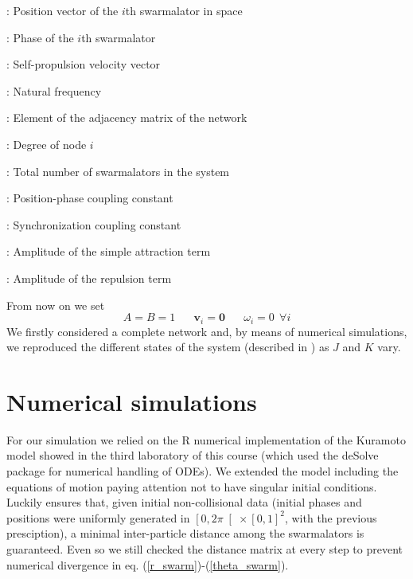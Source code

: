 \begin{multicols}{2}
\begin{description}[noitemsep]
    \item[\(\mathbf{x}_i\)]: Position vector of the \(i\)th swarmalator in space
    \item[\(\theta_i\)]: Phase of the \(i\)th swarmalator
    \item[\(\mathbf{v}_i\)]: Self-propulsion velocity vector
    \item[\(\omega_i\)]: Natural frequency
    \item[\(A_{ij}\)]: Element of the adjacency matrix of the network
    \item[\(k_i\)]: Degree of node \(i\)
\end{description}
\begin{description}[noitemsep]
    \item[\(N\)]: Total number of swarmalators in the system
    \item[\(J\)]: Position-phase coupling constant
    \item[\(K\)]: Synchronization coupling constant
    \item[\(A\)]: Amplitude of the simple attraction term
    \item[\(B\)]: Amplitude of the repulsion term
\end{description}
\end{multicols}

From now on we set
$$A=B=1 \;\;\;\;\;\; \mathbf{v}_i = \mathbf{0} \;\;\;\;\;\; \omega_i=0 \: \: \forall i$$
\newline
We firstly considered a complete network and, by means of numerical simulations, we reproduced the different states of the system (described in \cite{O_Keeffe_2017, Sar_2022}) as $J$ and $K$ vary. 

\newpage

\section{Numerical simulations}
For our simulation we relied on the R numerical implementation of the Kuramoto model showed in the third laboratory of this course (which used the deSolve package for numerical handling of ODEs).
We extended the model including the equations of motion paying attention not to have singular initial conditions. Luckily \cite{ha2019emergent} ensures that, given initial non-collisional data (initial phases and positions were uniformly generated in $\left[ 0,2 \pi \right[ \times \left[ 0,1 \right]^2$, with the previous presciption), a minimal inter-particle distance among the swarmalators is guaranteed. Even so we still checked the distance matrix at every step to prevent numerical divergence in eq. (\ref{r_swarm})-(\ref{theta_swarm}).

